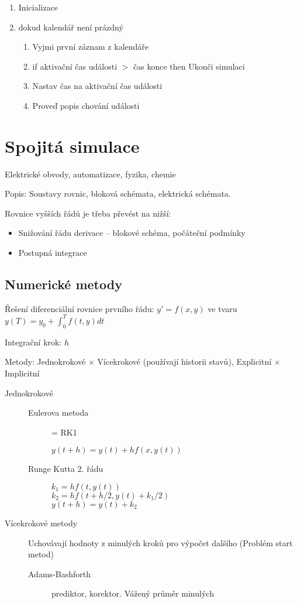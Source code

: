 \documentclass[a4wide]{report}
\begin{document}
\begin{enumerate}
	\item Inicializace
	\item dokud kalendář není prázdný
	\begin{enumerate}
		\item Vyjmi první záznam z kalendáře
		\item if aktivační čas události $>$ čas konce then Ukonči simulaci
		\item Nastav čas na aktivační čas události
		\item Proveď popis chování události
	\end{enumerate}
\end{enumerate}

\section{Spojitá simulace}

Elektrické obvody, automatizace, fyzika, chemie

Popis: Soustavy rovnic, bloková schémata, elektrická schémata.

Rovnice vyšších řádů je třeba převést na nižší:
\begin{itemize}
	\item Snižování řádu derivace -- blokové schéma, počáteční podmínky
	\item Postupná integrace
\end{itemize}

\subsection{Numerické metody}

Řešení diferenciální rovnice prvního řádu: $y' = f(x,y)$ ve tvaru $y(T) = y_0 + \int_0^T f(t,y)dt$

Integrační krok: $h$

Metody: Jednokrokové $\times$ Vícekrokové (používají historii stavů), Explicitní $\times$ Implicitní
\begin{description}
	\item[Jednokrokové] \hfill
	\begin{description}
		\item[Eulerova metoda] = RK1
		
		$y(t+h) = y(t) + h f(x, y(t) )$
		\item[Runge Kutta 2. řádu] \hfill

		$k_1 = hf(t, y(t))$\\
		$k_2 = hf(t + h/2, y(t) + k_1/2)$\\
		$y(t+h) = y(t) + k_2$
	\end{description}
	\item[Vícekrokové metody] Uchovávají hodnoty z minulých kroků pro výpočet dalšího (Problém start metod)
	\begin{description}
		\item[Adams-Bashforth] prediktor, korektor. Vážený průměr minulých
	\end{description}
\end{description}
\end{document}
